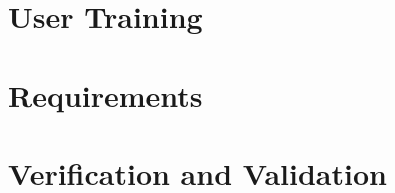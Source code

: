 \documentclass{simcenterdocumentation}
\begin{document}
\chapter{User Training}
\label{chap:training}


\chapter{Requirements}
\label{chap:requirements}


\chapter{Verification and Validation}
\label{chap:vnv}


\nocite{*}


\pagestyle{plain}
{
  \renewcommand{\thispagestyle}[1]{}	
  \printbibliography           
}
\end{document}

